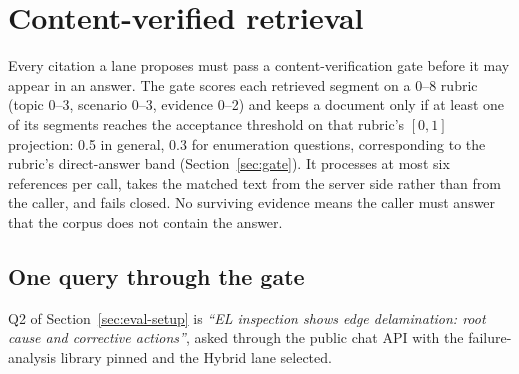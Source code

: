 \section{Content-verified retrieval}
\label{sec:retrieval}
\label{sec:lanes}

Every citation a lane proposes must pass a content-verification gate before it
may appear in an answer. The gate scores each retrieved segment on a 0--8 rubric
(topic 0--3, scenario 0--3, evidence 0--2) and keeps a document only if at least
one of its segments reaches the acceptance threshold on that rubric's $[0,1]$
projection: 0.5 in general, 0.3 for enumeration questions, corresponding to the
rubric's direct-answer band (Section~\ref{sec:gate}). It processes at most six
references per call, takes the
matched text from the server side rather than from the caller, and fails closed.
No surviving evidence means the caller must answer that the corpus does not
contain the answer.

\subsection{One query through the gate}
\label{sec:trace}

Q2 of Section~\ref{sec:eval-setup} is \emph{``EL inspection shows edge delamination:
root cause and corrective actions''}, asked through the public chat API with the
failure-analysis library pinned and the Hybrid lane selected.

